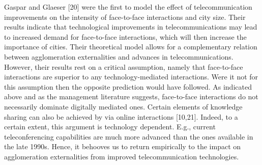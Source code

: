 \documentclass[10pt,letterpaper]{article}
\begin{document}
Gaspar and Glaeser {[}20{]} were the first to model the effect of
telecommunication improvements on the intensity of face-to-face
interactions and city size. Their results indicate that technological
improvements in telecommunications may lead to increased demand for
face-to-face interactions, which will then increase the importance of
cities. Their theoretical model allows for a complementary relation
between agglomeration externalities and advances in telecommunications.
However, their results rest on a critical assumption, namely that
face-to-face interactions are superior to any technology-mediated
interactions. Were it not for this assumption then the opposite
prediction would have followed. As indicated above and as the management
literature suggests, face-to-face interactions do not necessarily
dominate digitally mediated ones. Certain elements of knowledge sharing
can also be achieved by via online interactions {[}10,21{]}. Indeed, to
a certain extent, this argument is technology dependent. E.g., current
teleconferencing capabilities are much more advanced than the ones
available in the late 1990s. Hence, it behooves us to return empirically
to the impact on agglomeration externalities from improved
telecommunication technologies.
\end{document}

